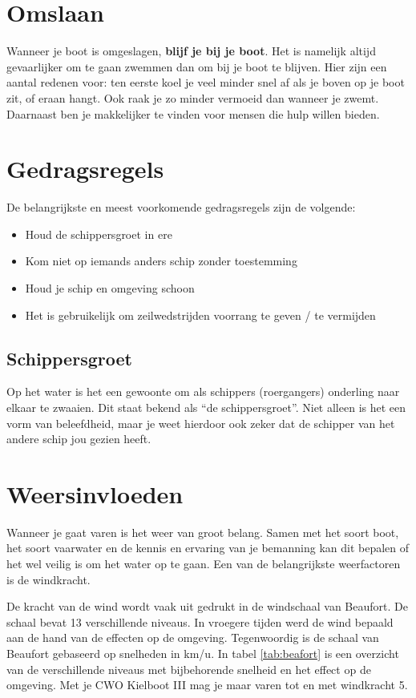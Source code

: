 \section{Omslaan}
Wanneer je boot is omgeslagen, \textbf{blijf je bij je boot}. Het is namelijk altijd gevaarlijker om te gaan zwemmen dan om bij je boot te blijven. Hier zijn een aantal redenen voor: ten eerste koel je veel minder snel af als je boven op je boot zit, of eraan hangt. Ook raak je zo minder vermoeid dan wanneer je zwemt. Daarnaast ben je makkelijker te vinden voor mensen die hulp willen bieden.
\section{Gedragsregels}
De belangrijkste en meest voorkomende gedragsregels zijn de volgende:
\begin{itemize}
    \item Houd de schippersgroet in ere
    \item Kom niet op iemands anders schip zonder toestemming
    \item Houd je schip en  omgeving schoon
    \item Het is gebruikelijk om zeilwedstrijden voorrang te geven / te vermijden
\end{itemize}
\subsection*{Schippersgroet}
Op het water is het een gewoonte om als schippers (roergangers) onderling naar elkaar te zwaaien. Dit staat bekend als ``de schippersgroet''. Niet alleen is het een vorm van beleefdheid, maar je weet hierdoor ook zeker dat de schipper van het andere schip jou gezien heeft. 

\section{Weersinvloeden}
Wanneer je gaat varen is het weer van groot belang. Samen met het soort boot, het soort vaarwater en de kennis en ervaring van je bemanning kan dit bepalen of het wel veilig is om het water op te gaan. Een van de belangrijkste weerfactoren is de windkracht.

De kracht van de wind wordt vaak uit gedrukt in de windschaal van Beaufort. De schaal bevat 13 verschillende niveaus. In vroegere tijden werd de wind bepaald aan de hand van de effecten op de omgeving. Tegenwoordig is de schaal van Beaufort gebaseerd op snelheden in km/u. In tabel \ref{tab:beafort} is een overzicht van de verschillende niveaus met bijbehorende snelheid en het effect op de omgeving. Met je CWO Kielboot III mag je maar varen tot en met windkracht 5.

